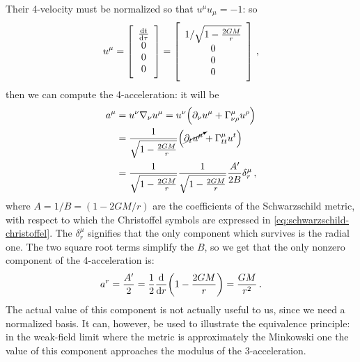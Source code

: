\documentclass[main.tex]{subfiles}
\begin{document}
Their 4-velocity must be normalized so that \(u^{\mu } u_{\mu }= -1\): so 
%
\begin{align}
  u^{\mu } = \left[\begin{array}{c}
  \dv{t}{\tau } \\ 
  0 \\ 
  0 \\ 
  0
  \end{array}\right]
  = 
  \left[\begin{array}{c}
  1/\sqrt{1 - \frac{2GM}{r}} \\ 
  0 \\ 
  0 \\ 
  0
  \end{array}\right]
\,,
\end{align}
%
then we can compute the 4-acceleration: it will be 
%
\begin{align}
  a^{\mu } &= u^{\nu } \nabla_{\nu } u^{\mu }
  = u^{\nu } \qty(\partial_{\nu } u^{\mu } + \Gamma^{\mu }_{\nu \rho } u^{\rho })  \\
  &= \frac{1}{\sqrt{1 - \frac{2GM}{r}}} \qty(\cancelto{}{\partial_{t} u^{\mu }} + \Gamma^{\mu }_{tt} u^{t})  \\
  &= \frac{1}{\sqrt{1-\frac{2GM}{r}}}
  \frac{1}{\sqrt{1-\frac{2GM}{r}}} \frac{A'}{2B} \delta^{\mu }_{r}
\,,
\end{align}
%
where \(A = 1/B = (1 - 2GM/r)\) are the coefficients of the Schwarzschild metric, with respect to which the Christoffel symbols are expressed in \eqref{eq:schwarzschild-christoffel}. 
The \(\delta^{\mu }_{r}\) signifies that the only component which survives is the radial one.
The two square root terms simplify the \(B\), so we get that the only nonzero component of the 4-acceleration is:
%
\begin{align}
  a^{r} = \frac{A^{\prime }}{2} =
  \frac{1}{2} \dv{}{r} \qty(1 - \frac{2GM}{r})
  = \frac{GM}{r^2}
\,.
\end{align}
%
The actual value of this component is not actually useful to us, since we need a normalized basis.
It can, however, be used to illustrate the equivalence principle: in the weak-field limit where the metric is approximately the Minkowski one the value of this component approaches the modulus of the 3-acceleration. 
\end{document}
